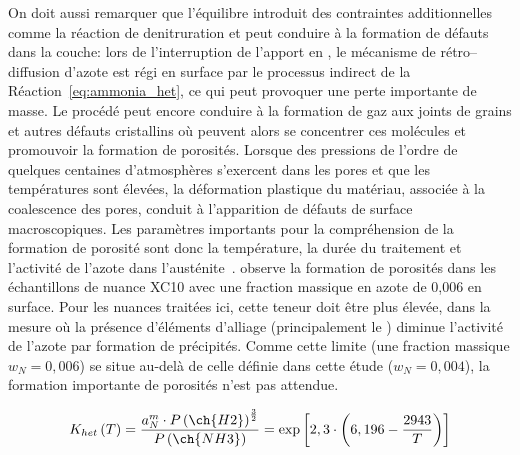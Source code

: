 On doit aussi remarquer que l'équilibre introduit des contraintes additionnelles comme la réaction de denitruration  et peut conduire à la formation de défauts dans la couche: lors de l'interruption de l'apport en , le mécanisme de rétro--diffusion d'azote est régi en surface par le processus indirect de la Réaction~\ref{eq:ammonia_het}, ce qui peut provoquer une perte importante de masse. Le procédé peut encore conduire à la formation de gaz  aux joints de grains et autres défauts cristallins où peuvent alors se concentrer ces molécules et promouvoir la formation de porosités. Lorsque des pressions de l'ordre de quelques centaines d'atmosphères s'exercent dans les pores et que les températures sont élevées, la déformation plastique du matériau, associée à la coalescence des pores, conduit à l'apparition de défauts de surface macroscopiques. Les paramètres importants pour la compréhension de la formation de porosité sont donc la température, la durée du traitement et l'activité de l'azote dans l'austénite~\cite{Yahia1995}.  \citet{Yahia1995} observe la formation de porosités dans les échantillons de nuance XC10 avec une fraction massique en azote de 0,006 en surface. Pour les nuances traitées ici, cette teneur doit être plus élevée, dans la mesure où la présence d'éléments d'alliage (principalement le ) diminue l'activité de l'azote par formation de précipités. Comme cette limite (une fraction massique $w_{N}=0,006$) se situe au-delà de celle définie dans cette étude ($w_{N}=0,004$), la formation importante de porosités n'est pas attendue.


\begin{equation}
  K_{het}\left(T\right)=
  \frac{a_{N}^{m}\cdot
  P\left(\ch{H2}\right)^{\frac{3}{2}}}{P\left(\ch{NH3}\right)}=
  \exp\left[2,3\cdot\left(6,196-\frac{2943}{T}\right)\right]
  \label{eq:ammonia_het_k}
\end{equation}

